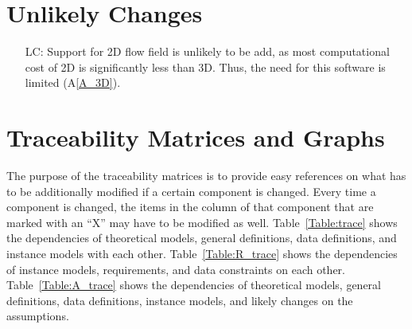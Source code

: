 \documentclass[12pt]{article}
\newcommand{\aref}[1]{A\ref{#1}}
\newcounter{lcnum} %
\begin{document}
\section{Unlikely Changes}    

\noindent \begin{itemize}

\item[LC\refstepcounter{lcnum}\thelcnum\label{LC_2D}:] Support for 2D flow field is unlikely to be add, as most computational cost of 2D is significantly less than 3D. Thus, the need for this software is limited (\aref{A_3D}).

\end{itemize}

\section{Traceability Matrices and Graphs}

The purpose of the traceability matrices is to provide easy references on what
has to be additionally modified if a certain component is changed.  Every time a
component is changed, the items in the column of that component that are marked
with an ``X'' may have to be modified as well.  Table~\ref{Table:trace} shows the
dependencies of theoretical models, general definitions, data definitions, and
instance models with each other. Table~\ref{Table:R_trace} shows the
dependencies of instance models, requirements, and data constraints on each
other. Table~\ref{Table:A_trace} shows the dependencies of theoretical models,
general definitions, data definitions, instance models, and likely changes on
the assumptions.



\end{document}
